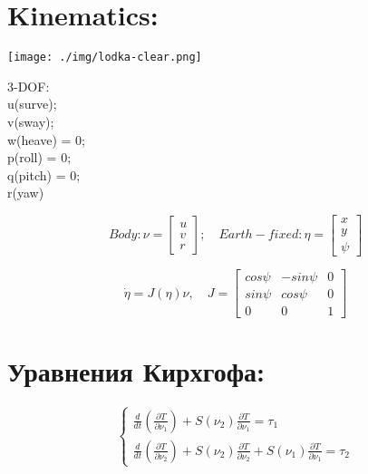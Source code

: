 \newpage

\section*{Kinematics:}

\begin{center}
\texttt{[image: ./img/lodka-clear.png]}
\end{center}

3-DOF: \\

u(surve); \\

v(sway); \\

w(heave) = 0; \\

p(roll) = 0; \\

q(pitch) = 0; \\

r(yaw)
\begin{center}
\begin{equation*}
Body: \nu = \begin{bmatrix}
u \\
v \\
r
\end{bmatrix};\quad Earth-fixed: \eta = \begin{bmatrix}
 x \\
 y \\
 \psi
 \end{bmatrix}
\end{equation*}
\end{center}
\begin{equation*}
\Dot{\eta} = J(\eta)\nu, \quad J = \begin{bmatrix}
cos\psi & -sin\psi & 0 \\
sin\psi & cos\psi & 0 \\
0 & 0 & 1
 \end{bmatrix}
\end{equation*}


\newpage
\section*{Уравнения Кирхгофа:}
\large
\begin{equation*}
 \begin{cases}
   \frac{d}{dt}(\frac{\partial T}{\partial \nu_1}) + S(\nu_2)\frac{\partial T}{\partial \nu_1} = \tau_1\\
   \frac{d}{dt}(\frac{\partial T}{\partial \nu_2}) + S(\nu_2)\frac{\partial T}{\partial \nu_2} + S(\nu_1)\frac{\partial T}{\partial \nu_1} = \tau_2
 \end{cases}
 \end{equation*}

